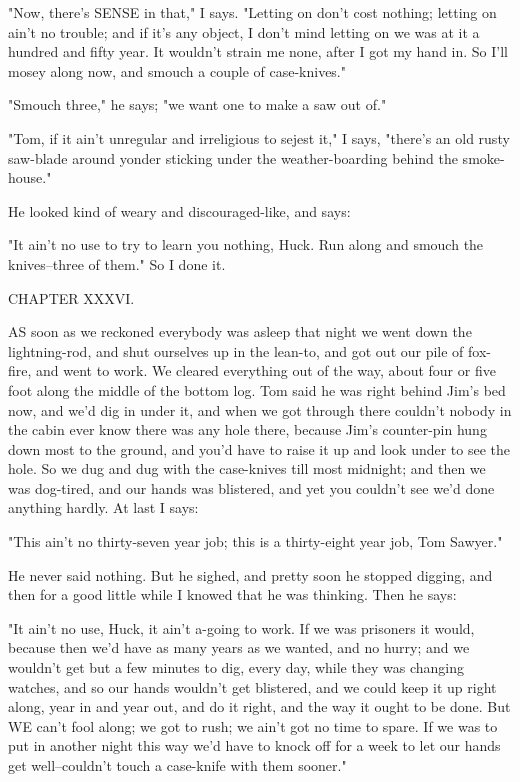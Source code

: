 "Now, there's SENSE in that," I says.  "Letting on don't cost nothing;
letting on ain't no trouble; and if it's any object, I don't mind letting
on we was at it a hundred and fifty year.  It wouldn't strain me none,
after I got my hand in.  So I'll mosey along now, and smouch a couple of
case-knives."

"Smouch three," he says; "we want one to make a saw out of."

"Tom, if it ain't unregular and irreligious to sejest it," I says,
"there's an old rusty saw-blade around yonder sticking under the
weather-boarding behind the smoke-house."

He looked kind of weary and discouraged-like, and says:

"It ain't no use to try to learn you nothing, Huck.  Run along and smouch
the knives--three of them."  So I done it.




CHAPTER XXXVI.

AS soon as we reckoned everybody was asleep that night we went down the
lightning-rod, and shut ourselves up in the lean-to, and got out our pile
of fox-fire, and went to work.  We cleared everything out of the way,
about four or five foot along the middle of the bottom log.  Tom said he
was right behind Jim's bed now, and we'd dig in under it, and when we got
through there couldn't nobody in the cabin ever know there was any hole
there, because Jim's counter-pin hung down most to the ground, and you'd
have to raise it up and look under to see the hole.  So we dug and dug
with the case-knives till most midnight; and then we was dog-tired, and
our hands was blistered, and yet you couldn't see we'd done anything
hardly.  At last I says:

"This ain't no thirty-seven year job; this is a thirty-eight year job,
Tom Sawyer."

He never said nothing.  But he sighed, and pretty soon he stopped
digging, and then for a good little while I knowed that he was thinking.
Then he says:

"It ain't no use, Huck, it ain't a-going to work.  If we was prisoners it
would, because then we'd have as many years as we wanted, and no hurry;
and we wouldn't get but a few minutes to dig, every day, while they was
changing watches, and so our hands wouldn't get blistered, and we could
keep it up right along, year in and year out, and do it right, and the
way it ought to be done.  But WE can't fool along; we got to rush; we
ain't got no time to spare.  If we was to put in another night this way
we'd have to knock off for a week to let our hands get well--couldn't
touch a case-knife with them sooner."

